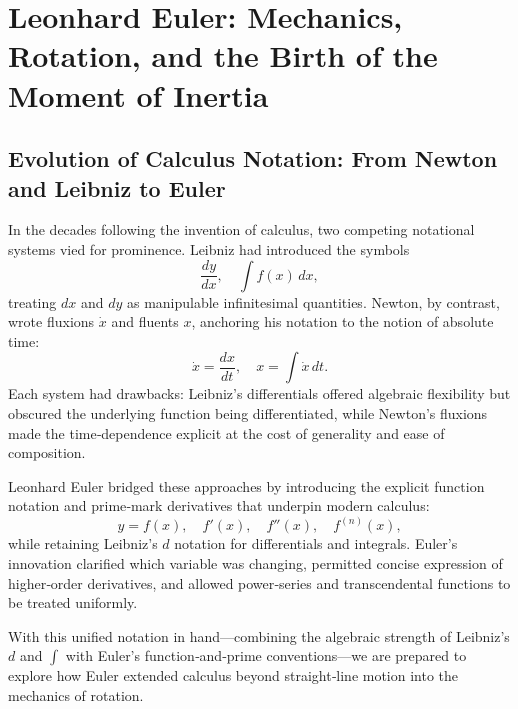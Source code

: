 \section{Leonhard Euler: Mechanics, Rotation, and the Birth of the Moment of Inertia}

\subsection{Evolution of Calculus Notation: From Newton and Leibniz to Euler}

In the decades following the invention of calculus, two competing notational systems vied for prominence.  Leibniz had introduced the symbols
\[
\frac{dy}{dx},\quad \int f(x)\,dx,
\]
treating \(dx\) and \(dy\) as manipulable infinitesimal quantities.  Newton, by contrast, wrote fluxions \( \dot{x} \) and fluents \(x\), anchoring his notation to the notion of absolute time:
\[
\dot{x} = \frac{dx}{dt},\quad x = \int \dot{x}\,dt.
\]
Each system had drawbacks: Leibniz’s differentials offered algebraic flexibility but obscured the underlying function being differentiated, while Newton’s fluxions made the time‐dependence explicit at the cost of generality and ease of composition.

Leonhard Euler bridged these approaches by introducing the explicit function notation and prime‐mark derivatives that underpin modern calculus:
\[
y = f(x),\quad f'(x),\quad f''(x),\quad f^{(n)}(x),
\]
while retaining Leibniz’s \(d\) notation for differentials and integrals.  Euler’s innovation clarified which variable was changing, permitted concise expression of higher‐order derivatives, and allowed power‐series and transcendental functions to be treated uniformly.

With this unified notation in hand—combining the algebraic strength of Leibniz’s \(d\) and \(\int\) with Euler’s function‐and‐prime conventions—we are prepared to explore how Euler extended calculus beyond straight‐line motion into the mechanics of rotation.  


